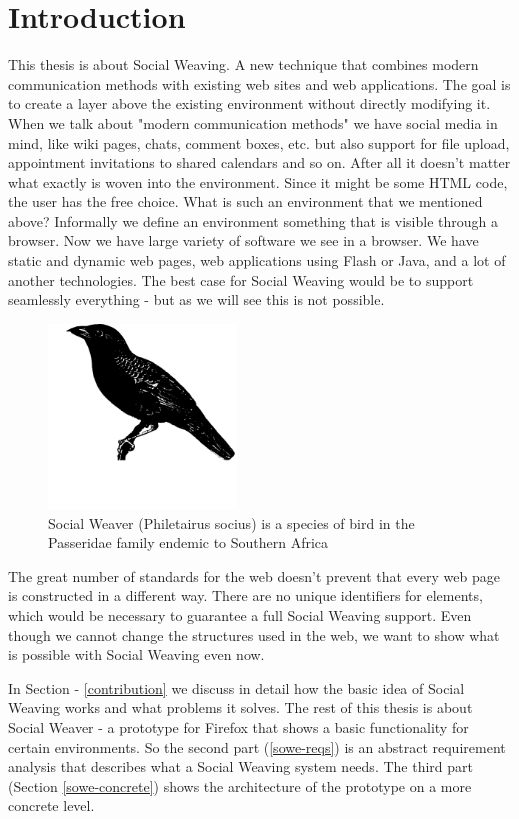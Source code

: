 \section{Introduction}

This thesis is about Social Weaving. A new technique that combines modern communication methods with existing web sites and web applications. The goal is to create a layer above the existing environment without directly modifying it. When we talk about "modern communication methods" we have social media in mind, like wiki pages, chats, comment boxes, etc. but also support for file upload, appointment invitations to shared calendars and so on. After all it doesn't matter what exactly is woven into the environment. Since it might be some HTML code, the user has the free choice. What is such an environment that we mentioned above? Informally we define an environment something that is visible through a browser. Now we have large variety of software we see in a browser. We have static and dynamic web pages, web applications using Flash or Java, and a lot of another technologies. The best case for Social Weaving would be to support seamlessly everything - but as we will see this is not possible.

\begin{figure}[!h]\centering
		\includegraphics[width=5cm]{images/socialweaver.png}
		\caption{Social Weaver (Philetairus socius) is a species of bird in the Passeridae family endemic to Southern Africa}
		\label{socialweaver}
\end{figure} 

The great number of standards for the web doesn't prevent that every web page is constructed in a different way. There are no unique identifiers for elements, which would be necessary to guarantee a full Social Weaving support. Even though we cannot change the structures used in the web, we want to show what is possible with Social Weaving even now. 

In Section  - \ref{contribution} we discuss in detail how the basic idea of Social Weaving works and what problems it solves. The rest of this thesis is about Social Weaver - a prototype for Firefox that shows a basic functionality for certain environments. So the second part (\ref{sowe-reqs}) is an abstract requirement analysis that describes what a Social Weaving system needs. The third part (Section \ref{sowe-concrete}) shows the architecture of the prototype on a more concrete level.